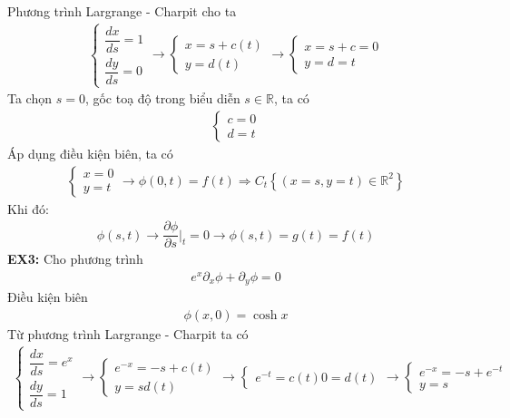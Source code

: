 \documentclass{article}
\newcommand{\f}[2]{\dfrac{#1}{#2}}
\newcommand{\at}[2]{\bigg\rvert_{#1}^{#2} }
\begin{document}
Phương trình Largrange - Charpit cho ta
\begin{gather}
	\begin{cases}
		\f{dx}{ds} = 1\\
		\f{dy}{ds} = 0
	\end{cases}
	\rightarrow
	\begin{cases}
		x = s + c(t)\\
		y = d(t)
	\end{cases}
	\rightarrow
	\begin{cases}
		x = s + c = 0\\
		y = d = t
	\end{cases}
\end{gather}
Ta chọn $s = 0$, gốc toạ độ trong biểu diễn $s \in \mathbb{R}$, ta có
\begin{gather}
	\begin{cases}
		c = 0\\
		d = t
	\end{cases}
\end{gather}
Áp dụng điều kiện biên, ta có
\begin{gather}
	\begin{cases}
		x = 0\\
		y = t
	\end{cases}
	\rightarrow \phi(0,t) = f(t) \Rightarrow C_{t} \left\{ ( x = s, y = t ) \in \mathbb{R}^{2} \right\}
\end{gather}
Khi đó:
\begin{gather}
	\phi(s,t) \rightarrow \f{\partial \phi}{\partial s} \at{t}{} = 0 \rightarrow \phi(s,t) = g(t) = f(t)
\end{gather}
\textbf{EX3:} Cho phương trình 
\begin{gather}
	e^{x} \partial_{x} \phi + \partial_{y} \phi = 0
\end{gather} 
Điều kiện biên
\begin{gather}
	\phi(x,0) = \cosh x
\end{gather}
Từ phương trình Largrange - Charpit ta có
\begin{gather}
	\begin{cases}
		\f{dx}{ds} = e^{x}\\
		\f{dy}{ds} = 1
	\end{cases}
	\rightarrow
	\begin{cases}
		e^{-x} = -s + c(t)\\
		y = s d(t)
	\end{cases}
	\rightarrow
	\begin{cases}
		e^{-t} = c(t)
		0 = d(t)
	\end{cases}
	\rightarrow
	\begin{cases}
		e^{-x} = -s + e^{-t}\\
		y = s
	\end{cases}
\end{gather}
\end{document}

